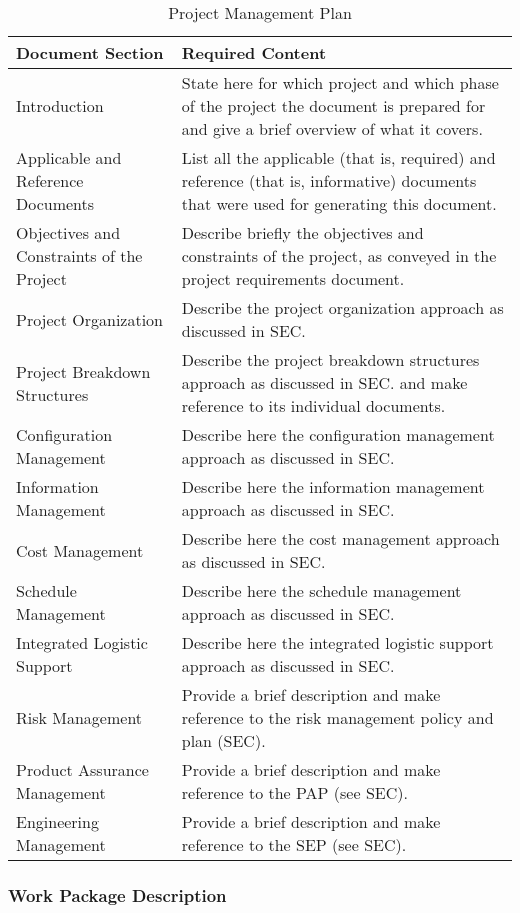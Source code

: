 \begin{table}[h]
\caption{Project Management Plan}
\centering
\begin{tabular}{l p{7cm}}
\toprule
\textbf{Document Section} & \textbf{Required Content} \\
\midrule
Introduction & State here for which project and which phase of the project the document is prepared for and give a brief overview of what it covers. \\
Applicable and Reference Documents & List all the applicable (that is, required) and reference (that is, informative) documents that were used for generating this document. \\
Objectives and Constraints of the Project & Describe briefly the objectives and constraints of the project, as conveyed in the project requirements document. \\
Project Organization & Describe the project organization approach as discussed in SEC. \\
Project Breakdown Structures & Describe the project breakdown structures approach as discussed in SEC. and make reference to its individual documents. \\
Configuration Management & Describe here the configuration management approach as discussed in SEC.\\
Information Management & Describe here the information management approach as discussed in SEC.\\
Cost Management & Describe here the cost management approach as discussed in SEC.\\
Schedule Management & Describe here the schedule management approach as discussed in SEC.\\
Integrated Logistic Support & Describe here the integrated logistic support approach as discussed in SEC. \\
Risk Management & Provide a brief description and make reference to the risk management policy and plan (SEC). \\
Product Assurance Management & Provide a brief description and make reference to the PAP (see SEC). \\
Engineering Management & Provide a brief description and make reference to the SEP (see SEC). \\
\bottomrule
\end{tabular}
\end{table}

\clearpage
\subsubsection{Work Package Description}
\label{app:Work Package Description}

